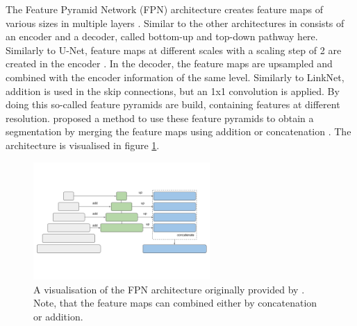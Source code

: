 The Feature Pyramid Network (FPN) architecture creates feature maps of various sizes in multiple layers \cite{Norelyaqine2023}. Similar to the other architectures in consists of an encoder and a decoder, called bottom-up and top-down pathway here\cite{fpn}. Similarly to U-Net, feature maps at different scales with a scaling step of 2 are created in the encoder \cite{fpn}. In the decoder, the feature maps are upsampled and combined with the encoder information of the same level. Similarly to LinkNet, addition is used in the skip connections, but an 1x1 convolution is applied. By doing this so-called feature pyramids are build, containing features at different resolution. \citeauthor{kirillov2019panoptic} proposed a method to use these feature pyramids to obtain a segmentation by merging the feature maps using addition or concatenation \cite{kirillov2019panoptic, SegmentationModels}. The architecture is visualised in figure \ref{fig:fpn-architecture}.

\begin{figure}
	\centering
	\includegraphics[width=0.6\textwidth]{fig/fpn-architecture.png}
	\caption{A visualisation of the FPN architecture originally provided by \citeauthor{SegmentationModels} \cite{SegmentationModels}. Note, that the feature maps can combined either by concatenation or addition.}
	\label{fig:fpn-architecture}
\end{figure}


